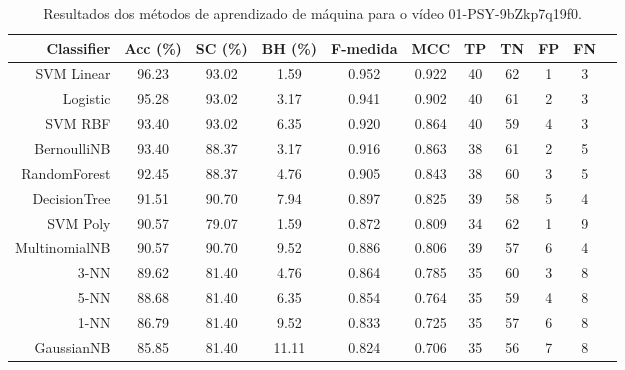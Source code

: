 \begin{table}[!htb]
\centering
\caption{Resultados dos métodos de aprendizado de máquina para o vídeo 01-PSY-9bZkp7q19f0.}
\label{tab:01-PSY-9bZkp7q19f0}
\begin{tabular}{r|c|c|c|c|c|c|c|c|c|c}
\hline\hline
Classifier & Acc (\%) & SC (\%) & BH (\%) & F-medida & MCC & TP & TN & FP & FN \\ \hline
SVM Linear & 96.23 & 93.02 & 1.59 & 0.952 & 0.922 & 40 & 62 & 1 & 3 \\ 
Logistic & 95.28 & 93.02 & 3.17 & 0.941 & 0.902 & 40 & 61 & 2 & 3 \\ 
SVM RBF & 93.40 & 93.02 & 6.35 & 0.920 & 0.864 & 40 & 59 & 4 & 3 \\ 
BernoulliNB & 93.40 & 88.37 & 3.17 & 0.916 & 0.863 & 38 & 61 & 2 & 5 \\ 
RandomForest & 92.45 & 88.37 & 4.76 & 0.905 & 0.843 & 38 & 60 & 3 & 5 \\ 
DecisionTree & 91.51 & 90.70 & 7.94 & 0.897 & 0.825 & 39 & 58 & 5 & 4 \\ 
SVM Poly & 90.57 & 79.07 & 1.59 & 0.872 & 0.809 & 34 & 62 & 1 & 9 \\ 
MultinomialNB & 90.57 & 90.70 & 9.52 & 0.886 & 0.806 & 39 & 57 & 6 & 4 \\ 
3-NN & 89.62 & 81.40 & 4.76 & 0.864 & 0.785 & 35 & 60 & 3 & 8 \\ 
5-NN & 88.68 & 81.40 & 6.35 & 0.854 & 0.764 & 35 & 59 & 4 & 8 \\ 
1-NN & 86.79 & 81.40 & 9.52 & 0.833 & 0.725 & 35 & 57 & 6 & 8 \\ 
GaussianNB & 85.85 & 81.40 & 11.11 & 0.824 & 0.706 & 35 & 56 & 7 & 8 \\ 
\hline\hline
\end{tabular}
\end{table}

